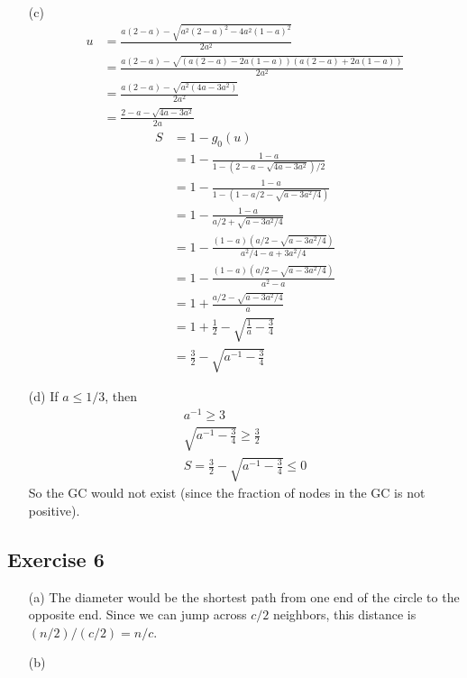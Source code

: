 \documentclass{article}
\begin{document}
\begin{enumerate}
  \item[(c)]
  \begin{align*}
    u &= \frac{a(2 - a) - \sqrt{a^2 (2 - a)^2 - 4a^2 (1 - a)^2}}{2a^2} \\
    &= \frac{a(2 - a) - \sqrt{(a(2 - a) - 2a(1 - a))(a(2 - a) + 2a(1 - a))}}{2a^2} \\
    &= \frac{a(2 - a) - \sqrt{a^2 (4a - 3a^2)}}{2a^2} \\
    &= \frac{2 - a - \sqrt{4a - 3a^2}}{2a}
  \end{align*}
  \begin{align*}
    S &= 1 - g_0(u) \\
    &= 1 - \frac{1 - a}{1 - (2 - a - \sqrt{4a - 3a^2}) / 2} \\
    &= 1 - \frac{1 - a}{1 - (1 - a / 2 - \sqrt{a - 3a^2 / 4})} \\
    &= 1 - \frac{1 - a}{a / 2 + \sqrt{a - 3a^2 / 4}} \\
    &= 1 - \frac{(1 - a)(a / 2 - \sqrt{a - 3a^2 / 4})}{a^2 / 4 - a + 3a^2 / 4} \\
    &= 1 - \frac{(1 - a)(a / 2 - \sqrt{a - 3a^2 / 4})}{a^2 - a} \\
    &= 1 + \frac{a / 2 - \sqrt{a - 3a^2 / 4}}{a} \\
    &= 1 + \frac{1}{2} - \sqrt{\frac{1}{a} - \frac{3}{4}} \\
    &= \frac{3}{2} - \sqrt{a^{-1} - \frac{3}{4}}
  \end{align*}

  \item[(d)]
  If \( a \le 1 / 3 \), then
  \begin{gather*}
    a^{-1} \ge 3 \\
    \sqrt{a^{-1} - \frac{3}{4}} \ge \frac{3}{2} \\
    S = \frac{3}{2} - \sqrt{a^{-1} - \frac{3}{4}} \le 0
  \end{gather*}
  So the GC would not exist (since the fraction of nodes in the GC is not
  positive).
\end{enumerate}

\newpage

\subsection*{Exercise 6}

\begin{enumerate}
  \item[(a)]
  The diameter would be the shortest path from one end of the circle to the
  opposite end. Since we can jump across \( c / 2 \) neighbors, this distance is
  \( (n / 2) / (c / 2) = \boxed{n / c} \).

  \item[(b)]
\end{enumerate}
\end{document}
